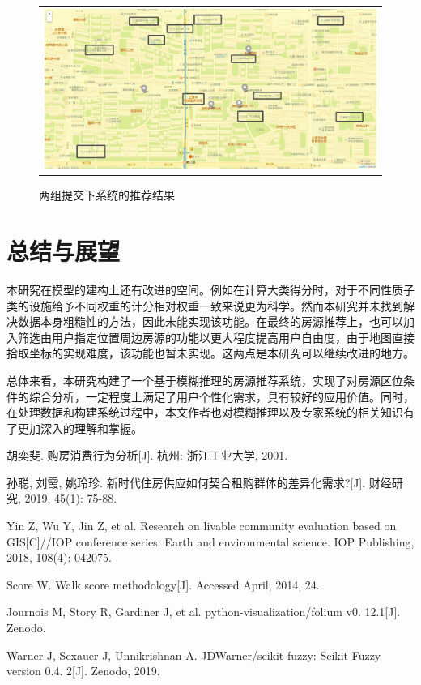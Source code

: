 \documentclass{article}
\begin{document}
\begin{figure}[htbp]
\begin{tabular}{c}
        \includegraphics[width=\textwidth]{./pic/用例2结果.png}
    \end{tabular}
\caption{两组提交下系统的推荐结果}
\label{实际实验}
\end{figure}

\section{总结与展望}

本研究在模型的建构上还有改进的空间。例如在计算大类得分时，对于不同性质子类的设施给予不同权重的计分相对权重一致来说更为科学。然而本研究并未找到解决数据本身粗糙性的方法，因此未能实现该功能。在最终的房源推荐上，也可以加入筛选由用户指定位置周边房源的功能以更大程度提高用户自由度，由于地图直接拾取坐标的实现难度，该功能也暂未实现。这两点是本研究可以继续改进的地方。

总体来看，本研究构建了一个基于模糊推理的房源推荐系统，实现了对房源区位条件的综合分析，一定程度上满足了用户个性化需求，具有较好的应用价值。同时，在处理数据和构建系统过程中，本文作者也对模糊推理以及专家系统的相关知识有了更加深入的理解和掌握。

\begin{thebibliography}{6}

 胡奕斐. 购房消费行为分析[J]. 杭州: 浙江工业大学, 2001.

 孙聪, 刘霞, 姚玲珍. 新时代住房供应如何契合租购群体的差异化需求?[J]. 财经研究, 2019, 45(1): 75-88.

 Yin Z, Wu Y, Jin Z, et al. Research on livable community evaluation based on GIS[C]//IOP conference series: Earth and environmental science. IOP Publishing, 2018, 108(4): 042075.

 Score W. Walk score methodology[J]. Accessed April, 2014, 24.

 Journois M, Story R, Gardiner J, et al. python-visualization/folium v0. 12.1[J]. Zenodo.

 Warner J, Sexauer J, Unnikrishnan A. JDWarner/scikit-fuzzy: Scikit-Fuzzy version 0.4. 2[J]. Zenodo, 2019.

\end{thebibliography}
\end{document}
